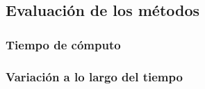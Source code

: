 \subsection{Evaluación de los métodos}

\subsubsection{Tiempo de cómputo}

\subsubsection{Variación a lo largo del tiempo}
